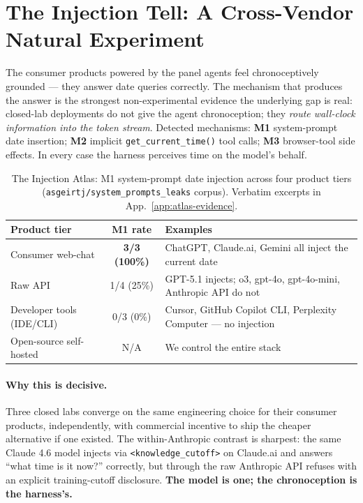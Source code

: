 
\section{The Injection Tell: A Cross-Vendor Natural Experiment}
\label{sec:injection-tell}

The consumer products powered by the panel agents feel chronoceptively grounded --- they answer date queries correctly. The mechanism that produces the answer is the strongest non-experimental evidence the underlying gap is real: closed-lab deployments do not give the agent chronoception; they \emph{route wall-clock information into the token stream}. Detected mechanisms: \textbf{M1} system-prompt date insertion; \textbf{M2} implicit \texttt{get\_current\_time()} tool calls; \textbf{M3} browser-tool side effects. In every case the harness perceives time on the model's behalf.

\begin{table}[h]
\centering
\small
\caption{The Injection Atlas: M1 system-prompt date injection across four product tiers (\texttt{asgeirtj/system\_prompts\_leaks} corpus). Verbatim excerpts in App.~\ref{app:atlas-evidence}.}
\label{tab:injection-atlas}
\begin{tabular}{lcp{7.2cm}}
\toprule
Product tier & M1 rate & Examples \\
\midrule
Consumer web-chat & \textbf{3/3 (100\%)} & ChatGPT, Claude.ai, Gemini all inject the current date \\
Raw API & 1/4 (25\%) & GPT-5.1 injects; o3, gpt-4o, gpt-4o-mini, Anthropic API do not \\
Developer tools (IDE/CLI) & 0/3 (0\%) & Cursor, GitHub Copilot CLI, Perplexity Computer --- no injection \\
Open-source self-hosted & N/A & We control the entire stack \\
\bottomrule
\end{tabular}
\end{table}

\paragraph{Why this is decisive.}
Three closed labs converge on the same engineering choice for their consumer products, independently, with commercial incentive to ship the cheaper alternative if one existed. The within-Anthropic contrast is sharpest: the same Claude 4.6 model injects via \texttt{<knowledge\_cutoff>} on Claude.ai and answers ``what time is it now?'' correctly, but through the raw Anthropic API refuses with an explicit training-cutoff disclosure. \textbf{The model is one; the chronoception is the harness's.}

